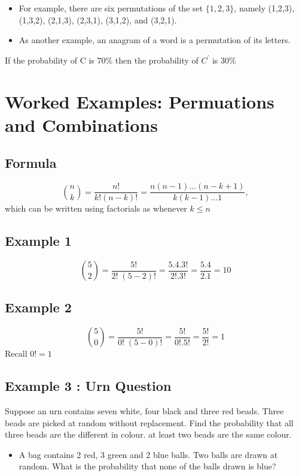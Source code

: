 \documentclass[12pt]{report}
\begin{document}
{\begin{itemize}
			\item For example, there are six permutations of the set $\{1,2,3\}$, namely (1,2,3), (1,3,2), (2,1,3), (2,3,1), (3,1,2), and (3,2,1). 
			\item As another example, an anagram of a word is a permutation of its letters. 
			
		\end{itemize}
		
If the probability of C is $70 \%$ then the probability of $C^{\prime}$ is $30\%$		

\section*{Worked Examples: Permuations and Combinations}

\subsection*{Formula}
\[ \binom nk  = \frac{n!}{k!(n-k)!} = \frac{n(n-1)\ldots(n-k+1)}{k(k-1)\dots 1},\]
which can be written using factorials as  whenever $k\leq n$

\subsection*{Example 1}

\[ \binom 5 2  = \frac{5!}{2!\;(5-2)!} = \frac{5.4.3!}{2! .3!} = \frac{5.4}{2.1} = 10\]

\subsection*{Example 2}

\[ \binom 5 0   = \frac{5!}{0!\;(5-0)!} = \frac{5!}{0! .5!} = \frac{5!}{2!} = 1\]
Recall $0! =1$
\subsection*{Example 3 :  Urn Question}	

Suppose an urn contains seven white, four black and three red beads. Three beads are picked at random without replacement.
Find the probability that all three beads are the different in colour.
at least two beads are the same colour.
\begin{itemize}	
	\item A bag contains 2 red, 3 green and 2 blue balls. Two balls are drawn at random. What is the probability that none of the balls drawn is blue?
	


\end{itemize}}
\end{document}
